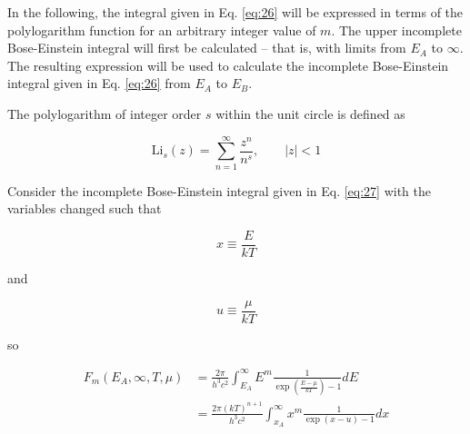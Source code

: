 \documentclass[letterpaper,12pt]{article}
\newcommand{\Li}{\textrm{Li}}
\begin{document}



In the following, the integral given in Eq. \ref{eq:26} will be expressed in terms of the polylogarithm function for an arbitrary integer value of $m$. The upper incomplete Bose-Einstein integral will first be calculated -- that is, with limits from $E_{A}$ to $\infty$. The resulting expression will be used to calculate the incomplete Bose-Einstein integral given in Eq. \ref{eq:26} from $E_{A}$ to $E_{B}$.

The polylogarithm of integer order $s$ within the unit circle is defined as

\begin{equation} \label{eq:22}
\Li_{s}(z) = \sum_{n = 1}^{\infty} \frac{z^{n}}{n^{s}}, \qquad |z| < 1
\end{equation}

Consider the incomplete Bose-Einstein integral given in Eq. \ref{eq:27} with the variables changed such that

\begin{equation} \label{eq:28}
x \equiv \frac{E}{kT}
\end{equation}

\noindent and

\begin{equation} \label{eq:29}
u \equiv \frac{\mu}{kT}
\end{equation}

\noindent so

\begin{align} \label{eq:27}
F_{m}(E_{A},\infty,T,\mu) &= \frac{2 \pi}{h^{3}c^{2}} \int_{E_{A}}^{\infty} E^{m} \frac{1}{\exp \left( \frac{E - \mu}{kT} \right) - 1} dE \nonumber \\
 &= \frac{2 \pi (kT)^{n+1}}{h^{3}c^{2}} \int_{x_{A}}^{\infty} x^{m} \frac{1}{\exp(x-u) - 1} dx
\end{align}
\end{document}
